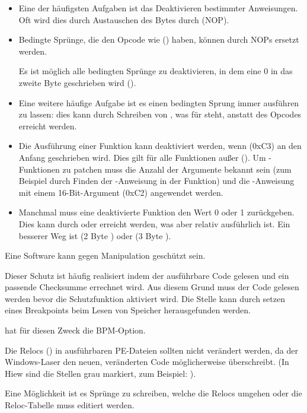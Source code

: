 \begin{itemize}

\item 
Eine der häufigsten Aufgaben ist das Deaktivieren bestimmter Anweisungen. Oft
wird dies durch Austauschen des Bytes durch  (\ac{NOP}).

\item
Bedingte Sprünge, die den Opcode wie  (\JZ) haben, können durch
\ac{NOP}s ersetzt werden.

Es ist möglich alle bedingten Sprünge zu deaktivieren, in dem eine 0 in das
zweite Byte geschrieben wird ().

\item 
Eine weitere häufige Aufgabe ist es einen bedingten Sprung immer ausführen zu
lassen: dies kann durch Schreiben von , was für \JMP steht, anstatt des
Opcodes erreicht werden.

\item Die Ausführung einer Funktion kann deaktiviert werden, wenn \RETN (0xC3) an
den Anfang geschrieben wird. Dies gilt für alle Funktionen außer 
().
Um -Funktionen zu patchen muss die Anzahl der Argumente bekannt sein
(zum Beispiel durch Finden der \RETN-Anweisung in der Funktion) und die \RETN-Anweisung
mit einem 16-Bit-Argument (0xC2) angewendet werden.

\item Manchmal muss eine deaktivierte Funktion den Wert 0 oder 1 zurückgeben.
Dies kann durch  oder  erreicht werden, was aber relativ
ausführlich ist.
Ein besserer Weg ist  (2 Byte ) oder 
(3 Byte ).

\end{itemize}

Eine Software kann gegen Manipulation geschützt sein.

Dieser Schutz ist häufig realisiert indem der ausführbare Code gelesen und ein
passende Checksumme errechnet wird.
Aus diesem Grund muss der Code gelesen werden bevor die Schutzfunktion aktiviert
wird. Die Stelle kann durch setzen eines Breakpoints beim Lesen von Speicher
herausgefunden werden.

\tracer hat für diesen Zweck die BPM-Option.

Die Relocs () in ausführbaren PE-Dateien sollten nicht
verändert werden, da der Windows-Laser den neuen, veränderten Code möglicherweise
überschreibt.
(In Hiew sind die Stellen grau markiert, zum Beispiel: ).

Eine Möglichkeit ist es Sprünge zu schreiben, welche die Relocs umgehen oder die
Reloc-Tabelle muss editiert werden.
